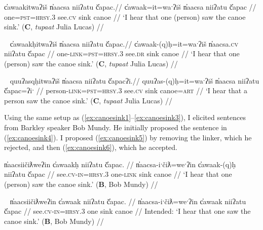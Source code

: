 \ex \label{ex:canoesink1}
\begingl
\glpreamble c̓awaakitwaʔiš n̓aacsa niiʔatu č̓apac.//
\gla c̓awaak=it=waˑʔiš n̓aacsa niiʔatu č̓apac //
\glb one=\textsc{pst}=\textsc{hrsy.3} see.\textsc{cv} sink canoe //
\glft `I hear that one (person) saw the canoe sink.' (\textbf{C}, \textit{tupaat} Julia Lucas) //
\endgl
\xe

\ex~ \label{ex:canoesink2}
\begingl
\glpreamble c̓awaakḥitwaʔiš n̓aacsa niiʔatu č̓apac.//
\gla c̓awaak-(q)ḥ=it=waˑʔiš n̓aacsa.\textsc{cv} niiʔatu č̓apac //
\glb one-\textsc{link}=\textsc{pst}=\textsc{hrsy.3} see.\textsc{dr} sink canoe //
\glft `I hear that one (person) saw the canoe sink.' (\textbf{C}, \textit{tupaat} Julia Lucas) //
\endgl
\xe

\ex~ \label{ex:canoesink3}
\begingl
\glpreamble quuʔasqḥitwaʔiš n̓aacsa niiʔatu č̓apacʔi.//
\gla quuʔas-(q)ḥ=it=waˑʔiš n̓aacsa niiʔatu č̓apac=ʔiˑ //
\glb person-\textsc{link}=\textsc{pst}=\textsc{hrsy.3} see.\textsc{cv} sink canoe=\textsc{art} //
\glft `I hear that a person saw the canoe sink.' (\textbf{C}, \textit{tupaat} Julia Lucas) //
\endgl
\xe


Using the same setup as (\ref{ex:canoesink1}--\ref{ex:canoesink3}), I elicited sentences from Barkley speaker Bob Mundy. He initially proposed the sentence in (\ref{ex:canoesink4}). I proposed (\ref{ex:canoesink5}) by removing the linker, which he rejected, and then (\ref{ex:canoesink6}), which he accepted.

\ex \label{ex:canoesink4}
\begingl
\glpreamble n̓aacsiičiƛweʔin c̓awaakḥ niiʔatu č̓apac. //
\gla n̓aacsa-iˑčiƛ=weˑʔin c̓awaak-(q)ḥ niiʔatu č̓apac //
\glb see.\textsc{cv}-\textsc{in}=\textsc{hrsy.3} one-\textsc{link} sink canoe //
\glft `I hear that one (person) saw the canoe sink.' (\textbf{B}, Bob Mundy) //
\endgl
\xe

\ex~ \label{ex:canoesink5}
\begingl
\glpreamble *n̓aacsiičiƛweʔin c̓awaak niiʔatu č̓apac. //
\gla n̓aacsa-iˑčiƛ=weˑʔin c̓awaak niiʔatu č̓apac //
\glb see.\textsc{cv}-\textsc{in}=\textsc{hrsy.3} one sink canoe //
\glft Intended: `I hear that one saw the canoe sink.' (\textbf{B}, Bob Mundy) //
\endgl
\xe

